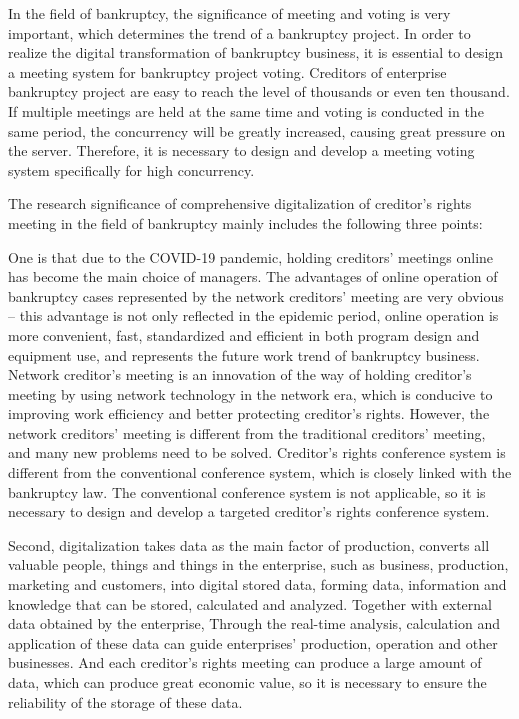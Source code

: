 \begin{digest}
In the field of bankruptcy, the significance of meeting and voting is very important, which determines the trend of a bankruptcy project. In order to realize the digital transformation of bankruptcy business, it is essential to design a meeting system for bankruptcy project voting. Creditors of enterprise bankruptcy project are easy to reach the level of thousands or even ten thousand. If multiple meetings are held at the same time and voting is conducted in the same period, the concurrency will be greatly increased, causing great pressure on the server. Therefore, it is necessary to design and develop a meeting voting system specifically for high concurrency.



The research significance of comprehensive digitalization of creditor's rights meeting in the field of bankruptcy mainly includes the following three points:

One is that due to the COVID-19 pandemic, holding creditors' meetings online has become the main choice of managers. The advantages of online operation of bankruptcy cases represented by the network creditors' meeting are very obvious -- this advantage is not only reflected in the epidemic period, online operation is more convenient, fast, standardized and efficient in both program design and equipment use, and represents the future work trend of bankruptcy business. Network creditor's meeting is an innovation of the way of holding creditor's meeting by using network technology in the network era, which is conducive to improving work efficiency and better protecting creditor's rights. However, the network creditors' meeting is different from the traditional creditors' meeting, and many new problems need to be solved. Creditor's rights conference system is different from the conventional conference system, which is closely linked with the bankruptcy law. The conventional conference system is not applicable, so it is necessary to design and develop a targeted creditor's rights conference system.



Second, digitalization takes data as the main factor of production, converts all valuable people, things and things in the enterprise, such as business, production, marketing and customers, into digital stored data, forming data, information and knowledge that can be stored, calculated and analyzed. Together with external data obtained by the enterprise, Through the real-time analysis, calculation and application of these data can guide enterprises' production, operation and other businesses. And each creditor's rights meeting can produce a large amount of data, which can produce great economic value, so it is necessary to ensure the reliability of the storage of these data.




\end{digest}
